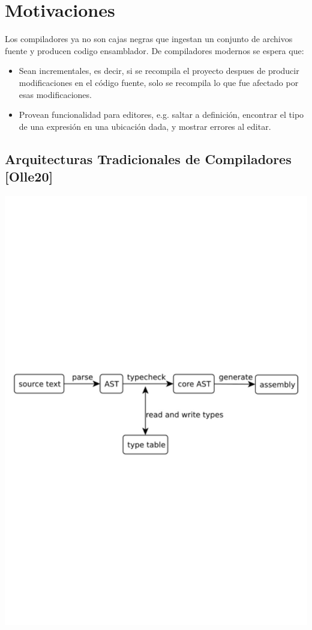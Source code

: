 \documentclass[12pt, a4paper]{report}
\begin{document}
\chapter*{Motivaciones}

Los compiladores ya no son cajas negras que ingestan un conjunto de archivos fuente y producen codigo ensamblador.
De compiladores modernos se espera que:

\begin{itemize}[noitemsep]
\item Sean incrementales, es decir, si se recompila el proyecto despues de producir modificaciones en el código fuente, solo se recompila lo que fue afectado por esas modificaciones.

\item Provean funcionalidad para editores, e.g. saltar a definición, encontrar el tipo de una expresión en una ubicación dada, y mostrar errores al editar.
\end{itemize}

\section*{Arquitecturas Tradicionales de Compiladores [Olle20]}

\noindent
\includegraphics[width=\textwidth]{olle_trad_comp_arq}
\cite{olle_query_based}
\end{document}
